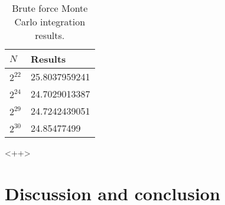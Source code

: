 \documentclass[a4paper,11pt]{article}
\begin{document}
\begin{table}
    \centering
    \caption{Brute force Monte Carlo integration results.}
    \begin{tabular}{l l}
        \hline
        $N$ &   Results \\
        \hline
        $2^{22}$  & 25.8037959241 \\
        $2^{24}$  & 24.7029013387 \\
        $2^{29}$  & 24.7242439051 \\
        $2^{30}$  & 24.85477499   \\ 
        \hline
    \end{tabular}
    \label{tab:<+label+>}
\end{table}<++>

\section{Discussion and conclusion}



\end{document}

